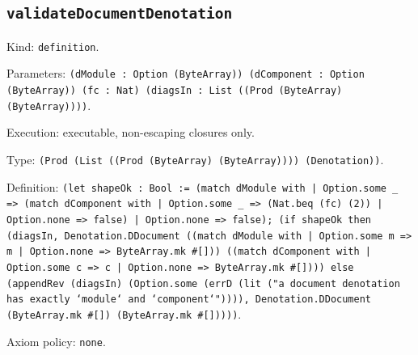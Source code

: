 \documentclass[11pt]{article}
\begin{document}
\subsection*{\texttt{validateDocumentDenotation}}
\noindent Kind: \texttt{definition}.\par
\noindent Parameters: \texttt{(dModule : Option (ByteArray)) (dComponent : Option (ByteArray)) (fc : Nat) (diagsIn : List ((Prod (ByteArray) (ByteArray))))}.\par
\noindent Execution: executable, non-escaping closures only.\par
\noindent Type: \texttt{(Prod (List ((Prod (ByteArray) (ByteArray)))) (Denotation))}.\par
\noindent Definition: \texttt{(let shapeOk : Bool := (match dModule with | Option.some \_ => (match dComponent with | Option.some \_ => (Nat.beq (fc) (2)) | Option.none => false) | Option.none => false); (if shapeOk then (diagsIn, Denotation.DDocument ((match dModule with | Option.some m => m | Option.none => ByteArray.mk \#[])) ((match dComponent with | Option.some c => c | Option.none => ByteArray.mk \#[]))) else (appendRev (diagsIn) (Option.some (errD (lit ("a document denotation has exactly `module` and `component`")))), Denotation.DDocument (ByteArray.mk \#[]) (ByteArray.mk \#[]))))}.\par
\noindent Axiom policy: \texttt{none}.\par
\end{document}
